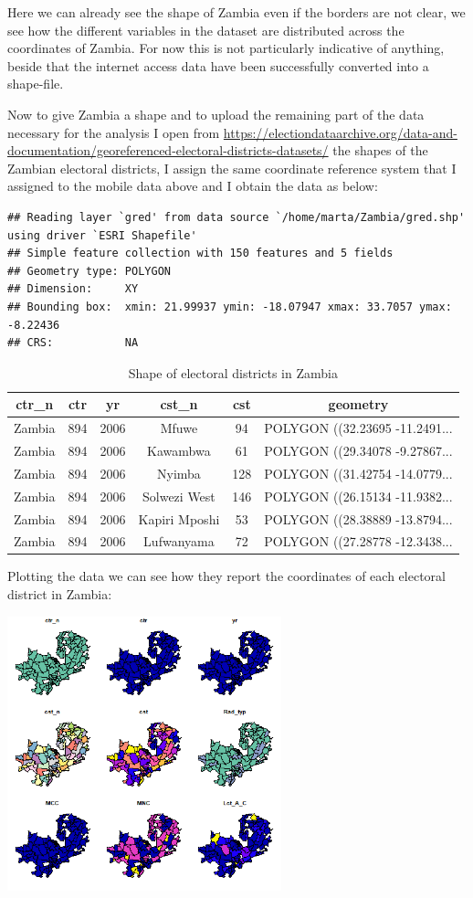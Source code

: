 \documentclass[
]{article}
\begin{document}
Here we can already see the shape of Zambia even if the borders are not
clear, we see how the different variables in the dataset are distributed
across the coordinates of Zambia. For now this is not particularly
indicative of anything, beside that the internet access data have been
successfully converted into a shape-file.

Now to give Zambia a shape and to upload the remaining part of the data
necessary for the analysis I open from
\url{https://electiondataarchive.org/data-and-documentation/georeferenced-electoral-districts-datasets/}
the shapes of the Zambian electoral districts, I assign the same
coordinate reference system that I assigned to the mobile data above and
I obtain the data as below:

\begin{verbatim}
## Reading layer `gred' from data source `/home/marta/Zambia/gred.shp' using driver `ESRI Shapefile'
## Simple feature collection with 150 features and 5 fields
## Geometry type: POLYGON
## Dimension:     XY
## Bounding box:  xmin: 21.99937 ymin: -18.07947 xmax: 33.7057 ymax: -8.22436
## CRS:           NA
\end{verbatim}

\begin{longtable}[t]{cccccc}
\caption{\label{tab:newshape}\resizebox{\textwidth}{!} {Shape of electoral districts in Zambia}}\\
\toprule
ctr\_n & ctr & yr & cst\_n & cst & geometry\\
\midrule
Zambia & 894 & 2006 & Mfuwe & 94 & POLYGON ((32.23695 -11.2491...\\
Zambia & 894 & 2006 & Kawambwa & 61 & POLYGON ((29.34078 -9.27867...\\
Zambia & 894 & 2006 & Nyimba & 128 & POLYGON ((31.42754 -14.0779...\\
Zambia & 894 & 2006 & Solwezi West & 146 & POLYGON ((26.15134 -11.9382...\\
Zambia & 894 & 2006 & Kapiri Mposhi & 53 & POLYGON ((28.38889 -13.8794...\\
\addlinespace
Zambia & 894 & 2006 & Lufwanyama & 72 & POLYGON ((27.28778 -12.3438...\\
\bottomrule
\end{longtable}

Plotting the data we can see how they report the coordinates of each
electoral district in Zambia:

\includegraphics[width=3.125in,height=\textheight]{gred.png}
\end{document}

